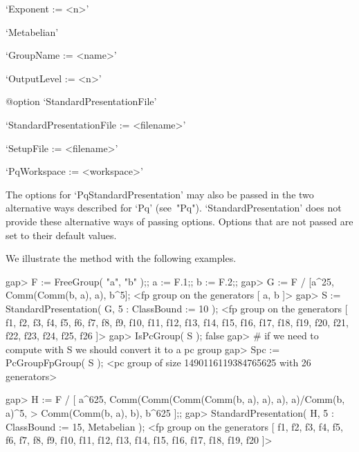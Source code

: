 \item{}`Exponent := <n>'

\item{}`Metabelian'

\item{}`GroupName := <name>'

\item{}`OutputLevel := <n>'

%
{@option \noexpand`StandardPresentationFile'}
\item{}`StandardPresentationFile := <filename>'

\item{}`SetupFile := <filename>'

\item{}`PqWorkspace := <workspace>'

\endlist

The options for `PqStandardPresentation' may also be passed  in  the  two
alternative ways described for  `Pq'  (see~"Pq").  `StandardPresentation'
does not provide these alternative ways of passing options. Options  that
are not passed are set to their default values.

We illustrate the method with the following examples.

\beginexample
gap> F := FreeGroup( "a", "b" );; a := F.1;; b := F.2;;
gap> G := F / [a^25, Comm(Comm(b, a), a), b^5];
<fp group on the generators [ a, b ]>
gap> S := StandardPresentation( G, 5 : ClassBound := 10 );
<fp group on the generators [ f1, f2, f3, f4, f5, f6, f7, f8, f9, f10, f11, 
  f12, f13, f14, f15, f16, f17, f18, f19, f20, f21, f22, f23, f24, f25, f26 ]>
gap> IsPcGroup( S );
false
gap> # if we need to compute with S we should convert it to a pc group
gap> Spc := PcGroupFpGroup( S );
<pc group of size 1490116119384765625 with 26 generators>

gap> H := F / [ a^625, Comm(Comm(Comm(Comm(b, a), a), a), a)/Comm(b, a)^5,
>               Comm(Comm(b, a), b), b^625 ];;                     
gap> StandardPresentation( H, 5 : ClassBound := 15, Metabelian );
<fp group on the generators [ f1, f2, f3, f4, f5, f6, f7, f8, f9, f10, f11, 
  f12, f13, f14, f15, f16, f17, f18, f19, f20 ]>

